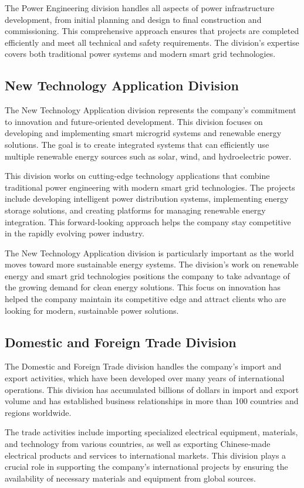 The Power Engineering division handles all aspects of power infrastructure development, from initial planning and design to final construction and commissioning. This comprehensive approach ensures that projects are completed efficiently and meet all technical and safety requirements. The division's expertise covers both traditional power systems and modern smart grid technologies.

\subsection{New Technology Application Division}
The New Technology Application division represents the company's commitment to innovation and future-oriented development. This division focuses on developing and implementing smart microgrid systems and renewable energy solutions. The goal is to create integrated systems that can efficiently use multiple renewable energy sources such as solar, wind, and hydroelectric power.

This division works on cutting-edge technology applications that combine traditional power engineering with modern smart grid technologies. The projects include developing intelligent power distribution systems, implementing energy storage solutions, and creating platforms for managing renewable energy integration. This forward-looking approach helps the company stay competitive in the rapidly evolving power industry.

The New Technology Application division is particularly important as the world moves toward more sustainable energy systems. The division's work on renewable energy and smart grid technologies positions the company to take advantage of the growing demand for clean energy solutions. This focus on innovation has helped the company maintain its competitive edge and attract clients who are looking for modern, sustainable power solutions.

\subsection{Domestic and Foreign Trade Division}
The Domestic and Foreign Trade division handles the company's import and export activities, which have been developed over many years of international operations. This division has accumulated billions of dollars in import and export volume and has established business relationships in more than 100 countries and regions worldwide.

The trade activities include importing specialized electrical equipment, materials, and technology from various countries, as well as exporting Chinese-made electrical products and services to international markets. This division plays a crucial role in supporting the company's international projects by ensuring the availability of necessary materials and equipment from global sources.


